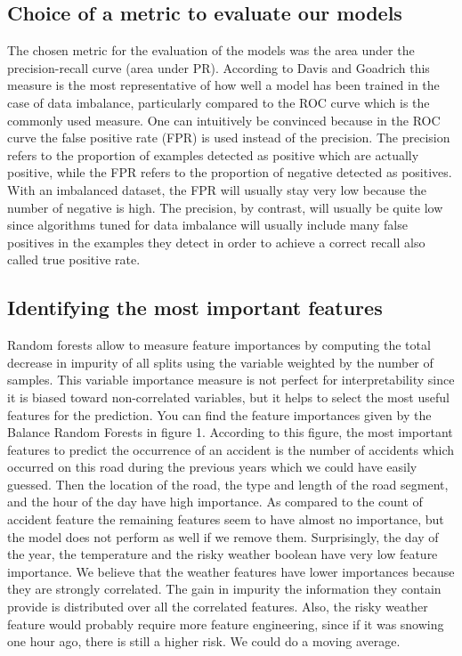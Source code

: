 \documentclass[conference]{IEEEtran}
\begin{document}
\subsection{Choice of a metric to evaluate our models}
The chosen metric for the evaluation of the models was the area under the precision-recall curve (area under PR). According to Davis and Goadrich\cite{Davis} this measure is the most representative of how well a model has been trained in the case of data imbalance, particularly compared to the ROC curve which is the commonly used measure. One can intuitively be convinced because in the ROC curve the false positive rate (FPR) is used instead of the precision. The precision refers to the proportion of examples detected as positive which are actually positive, while the FPR refers to the proportion of negative detected as positives. With an imbalanced dataset, the FPR will usually stay very low because the number of negative is high. The precision, by contrast, will usually be quite low since algorithms tuned for data imbalance will usually include many false positives in the examples they detect in order to achieve a correct recall also called true positive rate.

\subsection{Identifying the most important features}
Random forests allow to measure feature importances by computing the total decrease in impurity of all splits using the variable weighted by the number of samples. This variable importance measure is not perfect for interpretability since it is biased toward non-correlated variables, but it helps to select the most useful features for the prediction. You can find the feature importances given by the Balance Random Forests in figure 1. According to this figure, the most important features to predict the occurrence of an accident is the number of accidents which occurred on this road during the previous years which we could have easily guessed. Then the location of the road, the type and length of the road segment, and the hour of the day have high importance. As compared to the count of accident feature the remaining features seem to have almost no importance, but the model does not perform as well if we remove them. Surprisingly, the day of the year, the temperature and the risky weather boolean have very low feature importance. We believe that the weather features have lower importances because they are strongly correlated. The gain in impurity the information they contain provide is distributed over all the correlated features. Also, the risky weather feature would probably require more feature engineering, since if it was snowing one hour ago, there is still a higher risk. We could do a moving average.
\end{document}
